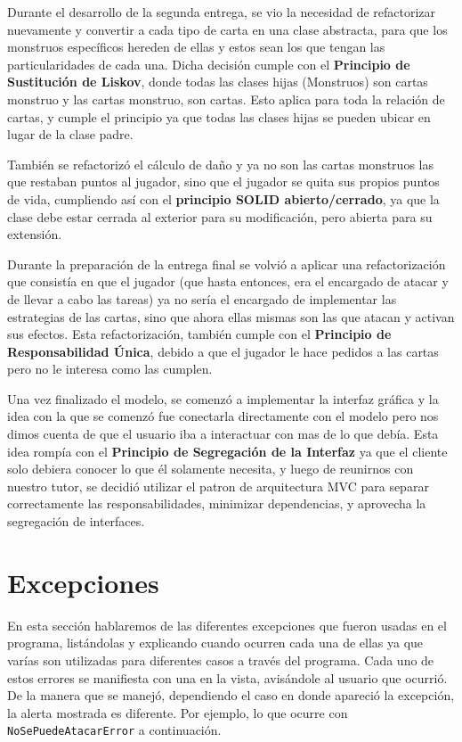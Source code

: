 	Durante el desarrollo de la segunda entrega, se vio la necesidad de refactorizar nuevamente y convertir a cada tipo de carta en una clase abstracta, para que los monstruos específicos hereden de ellas y estos sean los que tengan las particularidades de cada una. Dicha decisión cumple con el \textbf{Principio de Sustitución de Liskov}, donde todas las clases hijas (Monstruos) son cartas monstruo y las cartas monstruo, son cartas. Esto aplica para toda la relación de cartas, y cumple el principio ya que todas las clases hijas se pueden ubicar en lugar de la clase padre. 
	
	También se refactorizó el cálculo de daño y ya no son las cartas monstruos las que restaban puntos al jugador, sino que el jugador se quita sus propios puntos de vida, cumpliendo así con el \textbf{principio SOLID abierto/cerrado}, ya que la clase debe estar cerrada al exterior para su modificación, pero abierta para su extensión.
	
	Durante la preparación de la entrega final se volvió a aplicar una refactorización que consistía en que el jugador (que hasta entonces, era el encargado de atacar y de llevar a cabo las tareas) ya no sería el encargado de implementar las estrategias de las cartas, sino que ahora ellas mismas son las que atacan y activan sus efectos. Esta refactorización, también cumple con el \textbf{Principio de Responsabilidad Única}, debido a que el jugador le hace pedidos a las cartas pero no le interesa como las cumplen.
	
	Una vez finalizado el modelo, se comenzó a implementar la interfaz gráfica y la idea con la que se comenzó fue conectarla directamente con el modelo pero nos dimos cuenta de que el usuario iba a interactuar con mas de lo que debía. Esta idea rompía con el \textbf{Principio de Segregación de la Interfaz} ya que el cliente solo debiera conocer lo que él solamente necesita, y luego de reunirnos con nuestro tutor, se decidió utilizar el patron de arquitectura MVC para separar correctamente las responsabilidades, minimizar dependencias, y aprovecha la segregación de interfaces.	
	
	
	\section{Excepciones}
	
	En esta sección hablaremos de las diferentes excepciones que fueron usadas en el programa, listándolas y explicando cuando ocurren cada una de ellas ya que varías son utilizadas para diferentes casos a través del programa. Cada uno de estos errores se manifiesta con una  en la vista, avisándole al usuario que ocurrió. De la manera que se manejó, dependiendo el caso en donde apareció la excepción, la alerta mostrada es diferente. Por ejemplo, lo que ocurre con \texttt{NoSePuedeAtacarError} a continuación.
	

